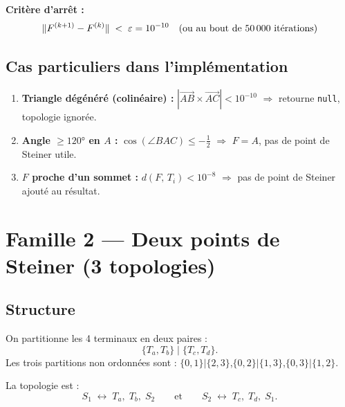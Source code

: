 \documentclass[12pt, a4paper]{article}
\newcommand{\dist}[2]{d\!\left(#1,\,#2\right)}
\begin{document}
\medskip

\textbf{Critère d'arrêt :}
\[
    \|F^{(k+1)} - F^{(k)}\| \;<\; \varepsilon = 10^{-10}
    \quad \text{(ou au bout de 50\,000 itérations)}
\]

\subsection{Cas particuliers dans l'implémentation}

\begin{enumerate}
    \item \textbf{Triangle dégénéré (colinéaire) :}
          $|\overrightarrow{AB} \times \overrightarrow{AC}| < 10^{-10}$ $\Rightarrow$
          retourne \texttt{null}, topologie ignorée.
    \item \textbf{Angle $\geq 120°$ en $A$ :} $\cos(\angle BAC) \leq -\tfrac{1}{2}$
          $\Rightarrow$ $F = A$, pas de point de Steiner utile.
    \item \textbf{$F$ proche d'un sommet :} $\dist{F}{T_i} < 10^{-8}$
          $\Rightarrow$ pas de point de Steiner ajouté au résultat.
\end{enumerate}

\section{Famille 2 — Deux points de Steiner (3 topologies)}

\subsection{Structure}

On partitionne les 4 terminaux en deux paires :
\[
    \{T_a, T_b\} \;|\; \{T_c, T_d\}.
\]
Les trois partitions non ordonnées sont :
$\{0,1\}|\{2,3\}$,\quad $\{0,2\}|\{1,3\}$,\quad $\{0,3\}|\{1,2\}$.

La topologie est :
\[
    S_1 \;\leftrightarrow\; T_a,\; T_b,\; S_2
    \qquad \text{et} \qquad
    S_2 \;\leftrightarrow\; T_c,\; T_d,\; S_1.
\]

\begin{center}
\end{center}
\end{document}

